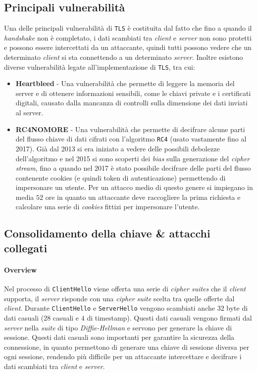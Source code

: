     \subsection{Principali vulnerabilità}
    Una delle principali vulnerabilità di \texttt{TLS} è costituita dal fatto che fino a quando il \textit{handshake} non è completato, i dati scambiati tra \textit{client} e \textit{server} non sono protetti e possono essere intercettati da un attaccante, quindi tutti possono vedere che un determinato \textit{client} si sta connettendo a un determinato \textit{server}. Inoltre esistono diverse vulnerabilità legate all'implementazione di \texttt{TLS}, tra cui: \begin{itemize}
        \item \textbf{Heartbleed} - Una vulnerabilità che permette di leggere la memoria del server e di ottenere informazioni sensibili, come le chiavi private e i certificati digitali, causato dalla mancanza di controlli sulla dimensione dei dati inviati al server.
        \item \textbf{RC4NOMORE} - Una vulnerabilità che permette di decifrare alcune parti del flusso chiave di dati cifrati con l'algoritmo \texttt{RC4} (usato vastamente fino al 2017). Già dal 2013 si era iniziato a vedere delle possibili debolezze dell'algoritmo e nel 2015 si sono scoperti dei \textit{bias} sulla generazione del \textit{cipher stream}, fino a quando nel 2017 è stato possibile decifrare delle parti del flusso contenente cookies (e quindi token di autenticazione) permettendo di impersonare un utente. Per un attacco medio di questo genere si impiegano in media $52$ ore in quanto un attaccante deve raccogliere la prima richiesta e calcolare una serie di \textit{cookies} fittizi per impersonare l'utente.
    \end{itemize}
    \subsection{Consolidamento della chiave \& attacchi collegati}
        \paragraph{Overview} Nel processo di \texttt{ClientHello} viene offerta una serie di \textit{cipher suites} che il \textit{client} supporta, il \textit{server} risponde con una \textit{cipher suite} scelta tra quelle offerte dal \textit{client}. Durante \texttt{ClientHello} e \texttt{ServerHello} vengono scambiati anche $32$ byte di dati casuali ($28$ casuali e $4$ di timestamp). Questi dati casuali vengono firmati dal \textit{server} nella \textit{suite} di tipo \textit{Diffie-Hellman} e servono per generare la chiave di sessione. Questi dati casuali sono importanti per garantire la sicurezza della connessione, in quanto permettono di generare una chiave di sessione diversa per ogni sessione, rendendo più difficile per un attaccante intercettare e decifrare i dati scambiati tra \textit{client} e \textit{server}.
